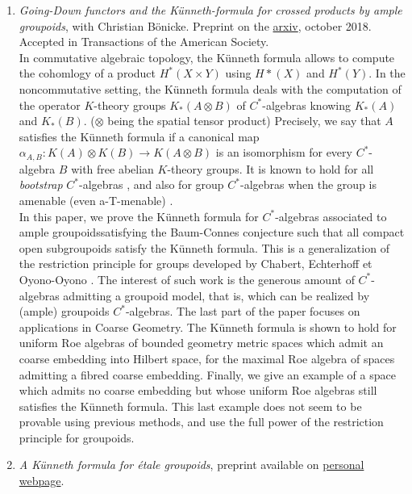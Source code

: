 \documentclass[a4paper]{article}
\begin{document}
\begin{enumerate}
\item \textit{Going-Down functors and the Künneth-formula for crossed products by ample groupoids}, with Christian Bönicke. Preprint on the \href{https://arxiv.org/abs/1810.04415}{arxiv}, october 2018. Accepted in Transactions of the American Society.\\

In commutative algebraic topology, the K\"unneth formula allows to compute the cohomlogy of a product $H^*(X\times Y)$ using $H*(X)$ and $H^*(Y)$. In the noncommutative setting, the K\"unneth formula deals with the computation of the operator $K$-theory groups $K_*(A \otimes B)$ of $C^*$-algebras knowing $K_*(A)$ and $K_*(B)$. ($\otimes$ being the spatial tensor product) Precisely, we say that $A$ satisfies the K\"unneth formula if a canonical map $\alpha_{A,B}: K(A)\otimes K(B) \rightarrow K(A\otimes B)$ is an isomorphism for every $C^*$-algebra $B$ with free abelian $K$-theory groups. It is known to hold for all \textit{bootstrap} $C^*$-algebras \cite{rosenberg1987kunneth}, and also for group $C^*$-algebras when the group is amenable (even a-T-menable) \cite{BaumConnesHigson}\cite{TuThese}. \\

In this paper, we prove the K\"unneth formula for $C^*$-algebras associated to ample groupoidssatisfying the Baum-Connes conjecture such that all compact open subgroupoids satisfy the K\"unneth formula. This is a generalization of the restriction principle for groups developed by Chabert, Echterhoff et Oyono-Oyono \cite{ChabertEOY}. The interest of such work is the generous amount of $C^*$-algebras admitting a groupoid model, that is, which can be realized by (ample) groupoids $C^*$-algebras. The last part of the paper focuses on applications in Coarse Geometry. The K\"unneth formula is shown to hold for uniform Roe algebras of bounded geometry metric spaces which admit an coarse embedding into Hilbert space, for the maximal Roe algebra of spaces admitting a fibred coarse embedding. Finally, we give an example of a space which admits no coarse embedding but whose uniform Roe algebras still satisfies the K\"unneth formula. This last example does not seem to be provable using previous methods, and use the full power of the restriction principle for groupoids.

\item \textit{A K\"{u}nneth formula for \'etale groupoids}, preprint available on \href{http://math.hawaii.edu/~dellaiera/Research.html}{personal webpage}.\\


\end{enumerate}
\end{document}
